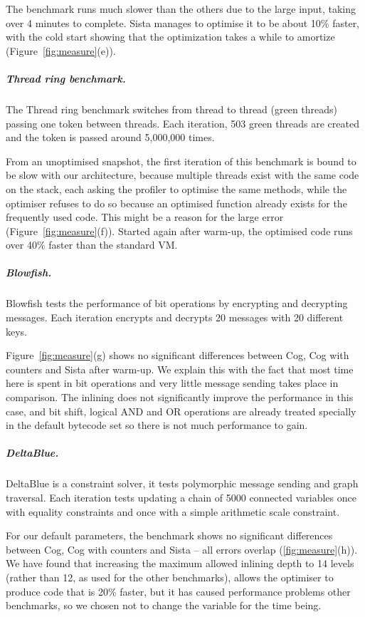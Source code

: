 \documentclass[a4paper,12pt,twoside]{../includes/ThesisStyle}
\begin{document}
The benchmark runs much slower than the others due to the large input, taking over 4 minutes to complete. Sista manages to optimise it to be about 10\% faster, with the cold start showing that the optimization takes a while to amortize (Figure~\ref{fig:measure}(e)).

\subparagraph{Thread ring benchmark.}

The Thread ring benchmark switches from thread to thread (green threads) passing one token between threads. Each iteration, 503 green threads are created and the token is passed around 5,000,000 times.

From an unoptimised snapshot, the first iteration of this benchmark is bound to be slow with our architecture, because multiple threads exist with the same code on the stack, each asking the profiler to optimise the same methods, while the optimiser refuses to do so because an optimised function already exists for the frequently used code. This might be a reason for the large error (Figure~\ref{fig:measure}(f)). Started again after warm-up, the optimised code runs over 40\% faster than the standard VM.

\subparagraph{Blowfish.}

Blowfish tests the performance of bit operations by encrypting and decrypting messages. Each iteration encrypts and decrypts 20 messages with 20 different keys.

Figure~\ref{fig:measure}(g) shows no significant differences between Cog, Cog with counters and Sista after warm-up. We explain this with the fact that most time here is spent in bit operations and very little message sending takes place in comparison. The inlining does not significantly improve the performance in this case, and bit shift, logical AND and OR operations are already treated specially in the default bytecode set so there is not much performance to gain.

\subparagraph{DeltaBlue.}

DeltaBlue is a constraint solver, it tests polymorphic message sending and graph traversal. Each iteration tests updating a chain of 5000 connected variables once with equality constraints and once with a simple arithmetic scale constraint.

For our default parameters, the benchmark shows no significant differences between Cog, Cog with counters and Sista -- all errors overlap (\ref{fig:measure}(h)). We have found that increasing the maximum allowed inlining depth to 14 levels (rather than 12, as used for the other benchmarks), allows the optimiser to produce code that is 20\% faster, but it has caused performance problems other benchmarks, so we chosen not to change the variable for the time being.
\end{document}
